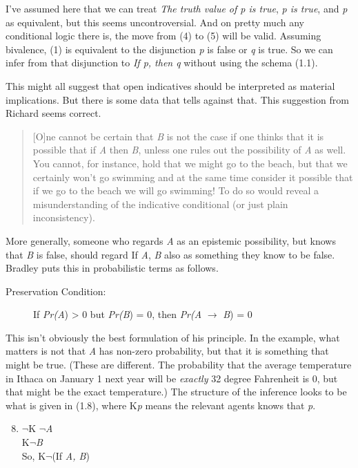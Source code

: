 \noindent I've assumed here that we can treat \textit{The truth value of p is true}, \textit{p is true}, and \textit{p} as equivalent, but this seems uncontroversial. And on pretty much any conditional logic there is, the move from (4) to (5) will be valid. Assuming bivalence, (1) is equivalent to the disjunction \textit{p} is false or \textit{q} is true. So we can infer from that disjunction to \textit{If p, then q} without using the schema (1.1). 

This might all suggest that open indicatives should be interpreted as material implications. But there is some data that tells against that. This suggestion from Richard \citet{Bradley2000} seems correct.

\begin{quote}
[O]ne cannot be certain that \textit{B} is not the case if one thinks that it is possible that if \textit{A} then \textit{B}, unless one rules out the possibility of \textit{A} as well. You cannot, for instance, hold that we might go to the beach, but that we certainly won't go swimming and at the same time consider it possible that if we go to the beach we will go swimming! To do so would reveal a misunderstanding of the indicative conditional (or just plain inconsistency). \cite[220]{Bradley2000}
\end{quote}

More generally, someone who regards \textit{A} as an epistemic possibility, but knows that \textit{B} is false, should regard If \textit{A}, \textit{B} also as something they know to be false. Bradley puts this in probabilistic terms as follows.

\begin{description}
\item[Preservation Condition:] If \textit{Pr(A}) > 0 but \textit{Pr(B}) = 0, then \textit{Pr(A} \(\rightarrow\) \textit{B}) = 0
\end{description}

\noindent This isn't obviously the best formulation of his principle. In the example, what matters is not that \textit{A} has non-zero probability, but that it is something that might be true. (These are different. The probability that the average temperature in Ithaca on January 1 next year will be \textit{exactly }32 degree Fahrenheit is 0, but that might be the exact temperature.) The structure of the inference looks to be what is given in (1.8), where K\textit{p} means the relevant agents knows that \textit{p}.

\renewcommand{\labelenumi}{(1.\arabic{enumi})}
\begin{enumerate}
\setcounter{enumi}{7}
\item  \(\neg\){}K \(\neg\){}\textit{A} \\
K\(\neg\){}\textit{B} \\
So, K\(\neg\){}(If\textit{ A, B})
\end{enumerate}

